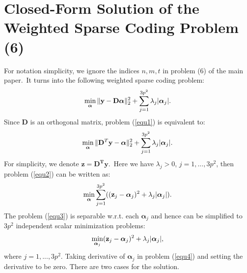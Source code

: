 \documentclass[10pt,onecolumn,letterpaper]{article}
\begin{document}
\section{Closed-Form Solution of the Weighted Sparse Coding Problem (6)}
For notation simplicity, we ignore the indices $n,m,t$ in problem (6) of the main paper.\ It turns into the following weighted sparse coding problem:
\vspace{-4mm}
\begin{equation}\label{equ1}\vspace{-2mm}
\min_{\bm{\alpha}}\|\mathbf{y}-\mathbf{D}\bm{\alpha}\|_{2}^{2}+\sum_{j=1}^{3p^2}\lambda_{j}|\bm{\alpha}_{j}|.
\end{equation}
Since $\mathbf{D}$ is an orthogonal matrix, problem (\ref{equ1}) is equivalent to:
\vspace{-2mm}
\begin{equation}\label{equ2}\vspace{-2mm}
\min_{\bm{\alpha}}\|\mathbf{D}^{T}\mathbf{y}-\bm{\alpha}\|_{2}^{2}+\sum_{j=1}^{3p^2}\lambda_{j}|\bm{\alpha}_{j}|.
\end{equation}
For simplicity, we denote $\mathbf{z} = \mathbf{D^{T}y}$.\ Here we have $\lambda_{j}>0$, $j=1,...,3p^2$, then problem (\ref{equ2}) can be written as:
\vspace{-2mm}
\begin{equation}\label{equ3}\vspace{-2mm}
\min_{\boldsymbol{\alpha}}\sum_{j=1}^{3p^2}((\mathbf{z}_{j}-\bm{\alpha}_{j})^{2}+\lambda_{j}|\bm{\alpha}_{j}|).
\end{equation}
The problem (\ref{equ3}) is separable w.r.t. each $\bm{\alpha}_{j}$ and hence can be simplified to $3p^2$ independent scalar minimization problems:
\vspace{-2mm}
\begin{equation}\label{equ4}\vspace{-2mm}
\min_{\bm{\alpha}_{j}}(\mathbf{z}_{j}-\bm{\alpha}_{j})^{2}+\lambda_{j}|\bm{\alpha}_{j}|,
\end{equation}
where $j=1,...,3p^2$. Taking derivative of $\boldsymbol{\alpha}_{j}$ in problem (\ref{equ4}) and setting the derivative to be zero. There are two cases for the solution.
\end{document}
